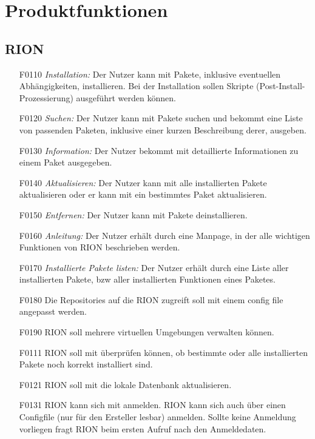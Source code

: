 \chapter{Produktfunktionen}

\section{RION}

\begin{itemize}
	\item[F0110] \textit{Installation:} Der Nutzer kann mit  Pakete, inklusive eventuellen Abhängigkeiten, installieren. Bei der Installation sollen Skripte (Post-Install-Prozessierung) ausgeführt werden können.
	\item[F0120] \textit{Suchen:} Der Nutzer kann mit  Pakete suchen und bekommt eine Liste von passenden Paketen, inklusive einer kurzen Beschreibung derer, ausgeben.
	\item[F0130] \textit{Information:} Der Nutzer bekommt mit  detaillierte Informationen zu einem Paket ausgegeben.
	\item[F0140] \textit{Aktualisieren:} Der Nutzer kann mit  alle installierten Pakete aktualisieren oder er kann mit  ein bestimmtes Paket aktualisieren.
	\item[F0150] \textit{Entfernen:} Der Nutzer kann mit  Pakete deinstallieren.
	\item[F0160] \textit{Anleitung:} Der Nutzer erhält durch  eine Manpage, in der alle wichtigen Funktionen von RION beschrieben werden.
	\item[F0170] \textit{Installierte Pakete listen:} Der Nutzer erhält durch  eine Liste aller installierten Pakete, bzw aller installierten Funktionen eines Paketes.
	\item[F0180] Die Repositories auf die RION zugreift soll mit einem config file angepasst werden.
	\item[F0190] RION soll mehrere virtuellen Umgebungen verwalten können.
	\item[F0111] RION soll mit 	 überprüfen können, ob bestimmte oder alle installierten Pakete noch korrekt installiert sind.
	\item[F0121] RION soll mit  die lokale Datenbank aktualisieren.
	\item[F0131] RION kann sich mit  anmelden. RION kann sich auch über einen Configfile (nur für den Ersteller lesbar) anmelden. Sollte keine Anmeldung vorliegen fragt RION beim ersten Aufruf nach den Anmeldedaten.
\end{itemize}

